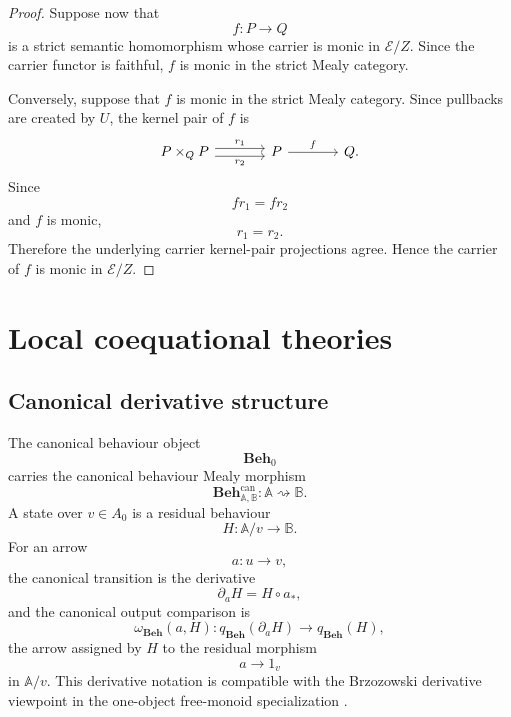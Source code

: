 \begin{proof}
    Suppose now that
    \[
        f:P\to Q
    \]
    is a strict semantic homomorphism whose carrier is monic in
    \(\mathcal E/Z\). Since the carrier functor is faithful, \(f\) is monic
    in the strict Mealy category.

    Conversely, suppose that \(f\) is monic in the strict Mealy category.
    Since pullbacks are created by \(U\), the kernel pair of \(f\) is
    \[
    \begin{tikzcd}[column sep=large, row sep=large]
        P\times_QP
            \arrow[r, shift left=0.65ex, "r_1"]
            \arrow[r, shift right=0.65ex, "r_2"']
        &
        P
            \arrow[r, "f"]
        &
        Q .
    \end{tikzcd}
    \]
    Since
    \[
        fr_1=fr_2
    \]
    and \(f\) is monic,
    \[
        r_1=r_2.
    \]
    Therefore the underlying carrier kernel-pair projections agree. Hence
    the carrier of \(f\) is monic in \(\mathcal E/Z\).
\end{proof}

\section{Local coequational theories}
\label{sec:local-coequational-theories}

\subsection{Canonical derivative structure}
\label{subsec:canonical-derivative-structure}

The canonical behaviour object
\[
    \mathbf{Beh}_0
\]
carries the canonical behaviour Mealy morphism
\[
    \mathbf{Beh}^{\mathrm{can}}_{\mathbb A,\mathbb B}:
    \mathbb A\rightsquigarrow\mathbb B.
\]
A state over \(v\in A_0\) is a residual behaviour
\[
    H:\mathbb A/v\to\mathbb B.
\]
For an arrow
\[
    a:u\to v,
\]
the canonical transition is the derivative
\[
    \partial_aH=H\circ a_*,
\]
and the canonical output comparison is
\[
    \omega_{\mathbf{Beh}}(a,H):
    q_{\mathbf{Beh}}(\partial_aH)\to q_{\mathbf{Beh}}(H),
\]
the arrow assigned by \(H\) to the residual morphism
\[
    a\to 1_v
\]
in \(\mathbb A/v\). This derivative notation is compatible with the
Brzozowski derivative viewpoint in the one-object free-monoid specialization
\cite{Brzozowski1964}.

